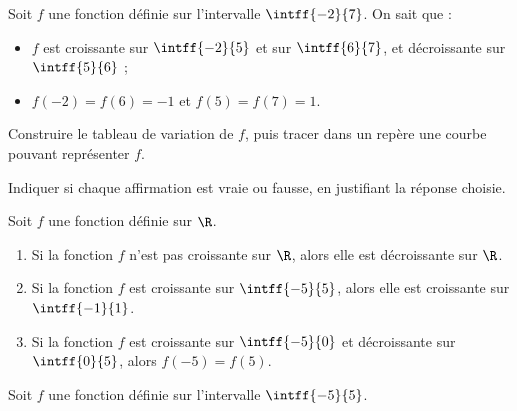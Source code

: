 \exo

Soit $f$ une fonction définie sur l'intervalle $\intff{-2}{7}$. On sait que :
\begin{itemize}
\item $f$ est  croissante sur $\intff{-2}{5}$ et sur $\intff{6}{7}$, et  décroissante sur $\intff{5}{6}$ ;
\item $f(-2)=f(6)=-1$ et $f(5)=f(7)=1$.
\end{itemize}
Construire le tableau de variation de $f$, puis tracer dans un repère une courbe pouvant représenter $f$.

\exo

Indiquer si chaque affirmation est vraie ou fausse, en justifiant la réponse choisie.

Soit $f$ une fonction définie sur $\R$.

\begin{enumerate}
\item Si la fonction $f$ n'est pas  croissante sur $\R$, alors elle est  décroissante sur $\R$.
\item Si la fonction $f$ est  croissante sur $\intff{-5}{5}$, alors elle est  croissante sur $\intff{-1}{1}$.
\item Si la fonction $f$ est  croissante sur $\intff{-5}{0}$ et  décroissante sur $\intff{0}{5}$, alors $f(-5)=f(5)$.
\end{enumerate}

\exo

Soit $f$ une fonction définie sur l'intervalle $\intff{-5}{5}$.

